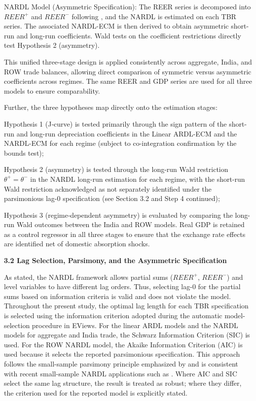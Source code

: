 \documentclass[12pt]{article}
\begin{document}
NARDL Model (Asymmetric Specification): The REER series is decomposed into $REER^{+}$ and $REER^{-}$ following \textcite{Shin2014-ap}, and the NARDL is estimated on each TBR series. The associated NARDL-ECM is then derived to obtain asymmetric short-run and long-run coefficients. Wald tests on the coefficient restrictions directly test Hypothesis 2 (asymmetry).

This unified three-stage design is applied consistently across aggregate, India, and ROW trade balances, allowing direct comparison of symmetric versus asymmetric coefficients across regimes. The same REER and GDP series are used for all three models to ensure comparability.

Further, the three hypotheses map directly onto the estimation stages: 

Hypothesis 1 (J‑curve) is tested primarily through the sign pattern of the short-run and long-run depreciation coefficients in the Linear ARDL-ECM and the NARDL-ECM for each regime (subject to co-integration confirmation by the bounds test); 

Hypothesis 2 (asymmetry) is tested through the long-run Wald restriction $\theta^{+} = \theta^{-}$ in the NARDL long-run estimation for each regime, with the short-run Wald restriction acknowledged as not separately identified under the parsimonious lag-0 specification (see Section 3.2 and Step 4 continued); 

Hypothesis 3 (regime‑dependent asymmetry) is evaluated by comparing the long-run Wald outcomes between the India and ROW models. Real GDP is retained as a control regressor in all three stages to ensure that the exchange rate effects are identified net of domestic absorption shocks.


\vspace{0.5cm}
\noindent\textbf{3.2 Lag Selection, Parsimony, and the Asymmetric Specification}

As \textcite{Shin2014-ap} stated, the NARDL framework allows partial sums ($REER^{+}$, $REER^{-}$) and level variables to have different lag orders. Thus, selecting lag-0 for the partial sums based on information criteria is valid and does not violate the model.
Throughout the present study, the optimal lag length for each TBR specification is selected using the information criterion adopted during the automatic model-selection procedure in EViews. For the linear ARDL models and the NARDL models for aggregate and India trade, the Schwarz Information Criterion (SIC) is used. For the ROW NARDL model, the Akaike Information Criterion (AIC) is used because it selects the reported parsimonious specification. This approach follows the small-sample parsimony principle emphasized by \textcite{Shin2014-ap} and is consistent with recent small-sample NARDL applications such as \textcite{Abegaz2024-wp}. Where AIC and SIC select the same lag structure, the result is treated as robust; where they differ, the criterion used for the reported model is explicitly stated.
\end{document}
